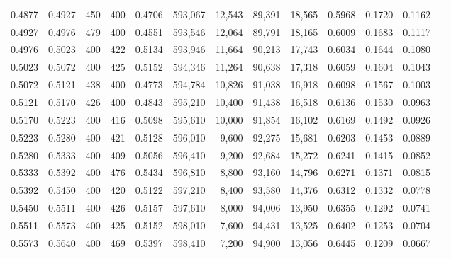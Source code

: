 \begin{tabular}{rrrrrrrrrrrrr}
0.4877 & 0.4927 &    450 &   400 &                                     0.4706 & 593,067 &  12,543 &  89,391 &  18,565 & 0.5968 & 0.1720 & 0.1162 \\
0.4927 & 0.4976 &    479 &   400 &                                     0.4551 & 593,546 &  12,064 &  89,791 &  18,165 & 0.6009 & 0.1683 & 0.1117 \\
0.4976 & 0.5023 &    400 &   422 &                                     0.5134 & 593,946 &  11,664 &  90,213 &  17,743 & 0.6034 & 0.1644 & 0.1080 \\
0.5023 & 0.5072 &    400 &   425 &                                     0.5152 & 594,346 &  11,264 &  90,638 &  17,318 & 0.6059 & 0.1604 & 0.1043 \\
0.5072 & 0.5121 &    438 &   400 &                                     0.4773 & 594,784 &  10,826 &  91,038 &  16,918 & 0.6098 & 0.1567 & 0.1003 \\
0.5121 & 0.5170 &    426 &   400 &                                     0.4843 & 595,210 &  10,400 &  91,438 &  16,518 & 0.6136 & 0.1530 & 0.0963 \\
0.5170 & 0.5223 &    400 &   416 &                                     0.5098 & 595,610 &  10,000 &  91,854 &  16,102 & 0.6169 & 0.1492 & 0.0926 \\
0.5223 & 0.5280 &    400 &   421 &                                     0.5128 & 596,010 &   9,600 &  92,275 &  15,681 & 0.6203 & 0.1453 & 0.0889 \\
0.5280 & 0.5333 &    400 &   409 &                                     0.5056 & 596,410 &   9,200 &  92,684 &  15,272 & 0.6241 & 0.1415 & 0.0852 \\
0.5333 & 0.5392 &    400 &   476 &                                     0.5434 & 596,810 &   8,800 &  93,160 &  14,796 & 0.6271 & 0.1371 & 0.0815 \\
0.5392 & 0.5450 &    400 &   420 &                                     0.5122 & 597,210 &   8,400 &  93,580 &  14,376 & 0.6312 & 0.1332 & 0.0778 \\
0.5450 & 0.5511 &    400 &   426 &                                     0.5157 & 597,610 &   8,000 &  94,006 &  13,950 & 0.6355 & 0.1292 & 0.0741 \\
0.5511 & 0.5573 &    400 &   425 &                                     0.5152 & 598,010 &   7,600 &  94,431 &  13,525 & 0.6402 & 0.1253 & 0.0704 \\
0.5573 & 0.5640 &    400 &   469 &                                     0.5397 & 598,410 &   7,200 &  94,900 &  13,056 & 0.6445 & 0.1209 & 0.0667 \\

\end{tabular}
